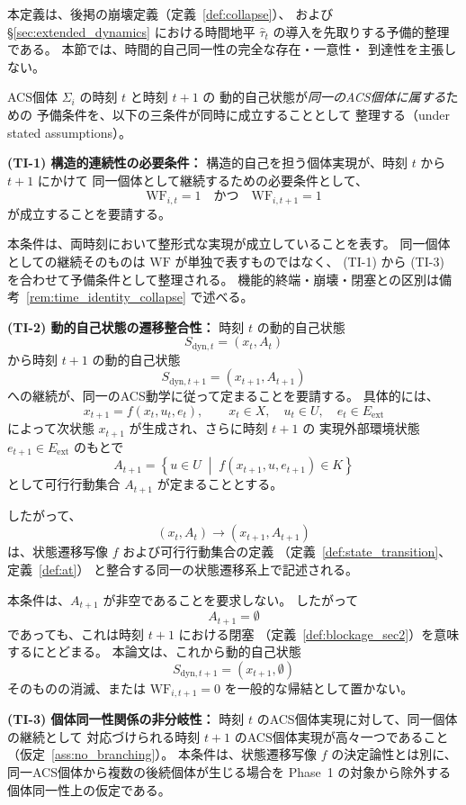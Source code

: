 \begin{definition}[時間的自己同一性の予備条件]
\label{def:time_identity}
本定義は、後掲の崩壊定義（定義~\ref{def:collapse}）、
および \S\ref{sec:extended_dynamics} における時間地平
$\widehat{\tau}_{t}$ の導入を先取りする予備的整理である。
本節では、時間的自己同一性の完全な存在・一意性・
到達性を主張しない。

ACS個体 $\Sigma_i$ の時刻 $t$ と時刻 $t+1$ の
動的自己状態が\emph{同一のACS個体に属する}ための
予備条件を、以下の三条件が同時に成立することとして
整理する（under stated assumptions）。

\medskip
\noindent\textbf{(TI-1) 構造的連続性の必要条件：}
構造的自己を担う個体実現が、時刻 $t$ から $t+1$ にかけて
同一個体として継続するための必要条件として、
\[
  \mathrm{WF}_{i,t}=1
  \quad\text{かつ}\quad
  \mathrm{WF}_{i,t+1}=1
\]
が成立することを要請する。

本条件は、両時刻において整形式な実現が成立していることを表す。
同一個体としての継続そのものは $\mathrm{WF}$ が単独で表すものではなく、
(TI-1) から (TI-3) を合わせて予備条件として整理される。
機能的終端・崩壊・閉塞との区別は備考~\ref{rem:time_identity_collapse} で述べる。

\medskip
\noindent\textbf{(TI-2) 動的自己状態の遷移整合性：}
時刻 $t$ の動的自己状態
\[
  S_{\mathrm{dyn},t}=(x_t,A_t)
\]
から時刻 $t+1$ の動的自己状態
\[
  S_{\mathrm{dyn},t+1}=(x_{t+1},A_{t+1})
\]
への継続が、同一のACS動学に従って定まることを要請する。
具体的には、
\[
  x_{t+1}=f(x_t,u_t,e_t),
  \qquad
  x_t\in X,\quad
  u_t\in U,\quad
  e_t\in E_{\mathrm{ext}}
\]
によって次状態 $x_{t+1}$ が生成され、さらに時刻 $t+1$ の
実現外部環境状態 $e_{t+1}\in E_{\mathrm{ext}}$ のもとで
\[
  A_{t+1}
  =
  \left\{
    u\in U
    \;\middle|\;
    f(x_{t+1},u,e_{t+1})\in K
  \right\}
\]
として可行行動集合 $A_{t+1}$ が定まることとする。

したがって、
\[
  (x_t,A_t)
  \longrightarrow
  (x_{t+1},A_{t+1})
\]
は、状態遷移写像 $f$ および可行行動集合の定義
（定義~\ref{def:state_transition}、定義~\ref{def:at}）
と整合する同一の状態遷移系上で記述される。

本条件は、$A_{t+1}$ が非空であることを要求しない。
したがって
\[
  A_{t+1}=\emptyset
\]
であっても、これは時刻 $t+1$ における閉塞
（定義~\ref{def:blockage_sec2}）を意味するにとどまる。
本論文は、これから動的自己状態
\[
  S_{\mathrm{dyn},t+1}
  =
  (x_{t+1},\emptyset)
\]
そのものの消滅、または
$\mathrm{WF}_{i,t+1}=0$
を一般的な帰結として置かない。

\medskip
\noindent\textbf{(TI-3) 個体同一性関係の非分岐性：}
時刻 $t$ のACS個体実現に対して、同一個体の継続として
対応づけられる時刻 $t+1$ のACS個体実現が高々一つであること
（仮定~\ref{ass:no_branching}）。
本条件は、状態遷移写像 $f$ の決定論性とは別に、
同一ACS個体から複数の後続個体が生じる場合を
Phase~1 の対象から除外する個体同一性上の仮定である。


\end{definition}
